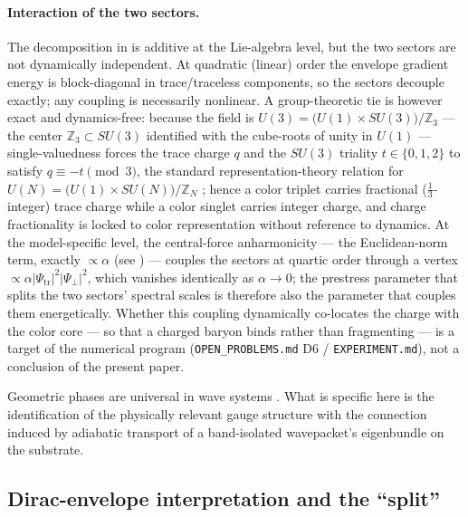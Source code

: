\paragraph{Interaction of the two sectors.}
The decomposition in  is additive at the Lie-algebra level, but the two sectors are not dynamically independent.
At quadratic (linear) order the envelope gradient energy is block-diagonal in trace/traceless components, so the sectors decouple exactly; any coupling is necessarily nonlinear.
A group-theoretic tie is however exact and dynamics-free: because the field is $U(3)=\bigl(U(1)\times SU(3)\bigr)/\mathbb{Z}_3$ --- the center $\mathbb{Z}_3\subset SU(3)$ identified with the cube-roots of unity in $U(1)$ --- single-valuedness forces the trace charge $q$ and the $SU(3)$ triality $t\in\{0,1,2\}$ to satisfy $q\equiv -t\pmod{3}$, the standard representation-theory relation for $U(N)=\bigl(U(1)\times SU(N)\bigr)/\mathbb{Z}_N$ \citep{GeorgiGlashow1974,BaezHuerta2010GUTAlgebra}; hence a color triplet carries fractional ($\tfrac{1}{3}$-integer) trace charge while a color singlet carries integer charge, and charge fractionality is locked to color representation without reference to dynamics.
At the model-specific level, the central-force anharmonicity --- the Euclidean-norm term, exactly $\propto\alpha$ (see ) --- couples the sectors at quartic order through a vertex $\propto\alpha|\Psi_{\mathrm{tr}}|^2|\Psi_\perp|^2$, which vanishes identically as $\alpha\to 0$; the prestress parameter that splits the two sectors' spectral scales is therefore also the parameter that couples them energetically.
Whether this coupling dynamically co-locates the charge with the color core --- so that a charged baryon binds rather than fragmenting --- is a target of the numerical program (\texttt{OPEN\_PROBLEMS.md} D6 / \texttt{EXPERIMENT.md}), not a conclusion of the present paper.

Geometric phases are universal in wave systems \citep{Pancharatnam1956,Berry1984,WilczekZee1984,Bliokh2015SpinOrbit,Cisowski2022}.
What is specific here is the identification of the physically relevant gauge structure with the
connection induced by adiabatic transport of a band-isolated wavepacket's eigenbundle on the substrate.

\subsection{Dirac-envelope interpretation and the ``split''}

